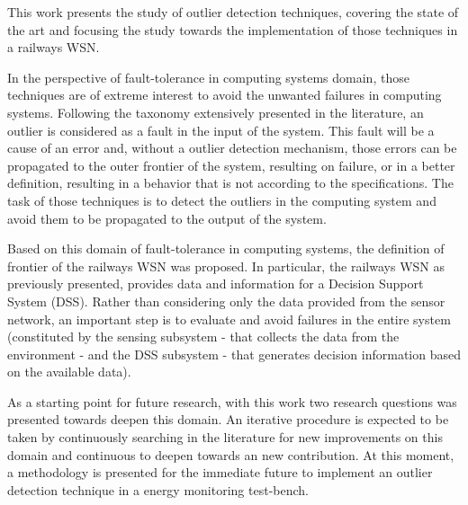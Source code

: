 

This work presents the study of outlier detection techniques, covering the state of the art and focusing the study towards the implementation of those techniques in a railways WSN.

In the perspective of fault-tolerance in computing systems domain, those techniques are of extreme interest to avoid the unwanted failures in computing systems.
Following the taxonomy extensively presented in the literature, an outlier is considered as a fault in the input of the system. This fault will be a cause of an error and, without a outlier detection mechanism, those errors can be propagated to the outer frontier of the system, resulting on failure, or in a better definition, resulting in a behavior that is not according to the specifications. 
The task of those techniques is to detect the outliers in the computing system and avoid them to be propagated to the output of the system. 

Based on this domain of fault-tolerance in computing systems, the definition of frontier of the railways WSN was proposed. In particular, the railways WSN as previously presented, provides data and information for a Decision Support System (DSS).
Rather than considering only the data provided from the sensor network, an important step is to evaluate and avoid failures in the entire system (constituted by the sensing subsystem - that collects the data from the environment - and the DSS subsystem - that generates decision information based on the available data). 

As a starting point for future research, with this work two research questions was presented towards deepen this domain. An iterative procedure is expected to be taken by continuously searching in the literature for new improvements on this domain and continuous to deepen towards an new contribution. At this moment, a methodology is presented for the immediate future to implement an outlier detection technique in a energy monitoring test-bench.
